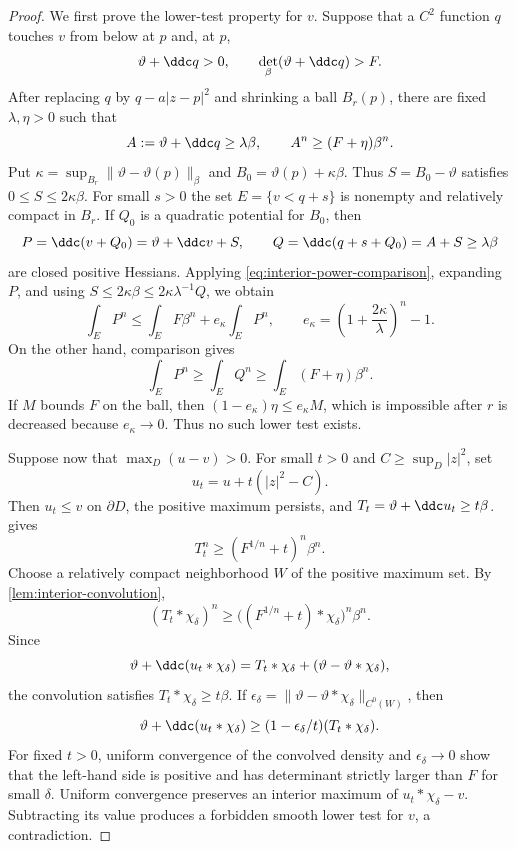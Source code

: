 \begin{proof}
We first prove the lower-test property for $v$. Suppose that a $C^2$ function $q$ touches $v$ from below at $p$ and, at $p$,
\[
  \vartheta+\ddc q>0,
  \qquad
  \det_\beta(\vartheta+\ddc q)>F.
\]
After replacing $q$ by $q-a|z-p|^2$ and shrinking a ball $B_r(p)$, there are fixed $\lambda,\eta>0$ such that
\[
  A:=\vartheta+\ddc q\geq\lambda\beta,
  \qquad A^n\geq(F+\eta)\beta^n.
\]
Put $\kappa=\sup_{B_r}\lVert\vartheta-\vartheta(p)\rVert_\beta$ and $B_0=\vartheta(p)+\kappa\beta$. Thus $S=B_0-\vartheta$ satisfies $0\leq S\leq2\kappa\beta$. For small $s>0$ the set $E=\{v<q+s\}$ is nonempty and relatively compact in $B_r$. If $Q_0$ is a quadratic potential for $B_0$, then
\[
  P=\ddc(v+Q_0)=\vartheta+\ddc v+S,
  \qquad
  Q=\ddc(q+s+Q_0)=A+S\geq\lambda\beta
\]
are closed positive Hessians. Applying \eqref{eq:interior-power-comparison}, expanding $P$, and using $S\leq2\kappa\beta\leq2\kappa\lambda^{-1}Q$, we obtain
\[
  \int_E P^n\leq\int_E F\beta^n+e_\kappa\int_E P^n,
  \qquad
  e_\kappa=\left(1+\frac{2\kappa}{\lambda}\right)^n-1.
\]
On the other hand, comparison gives
\[
  \int_E P^n\geq\int_E Q^n\geq\int_E(F+\eta)\beta^n.
\]
If $M$ bounds $F$ on the ball, then $(1-e_\kappa)\eta\leq e_\kappa M$, which is impossible after $r$ is decreased because $e_\kappa\to0$. Thus no such lower test exists.

Suppose now that $\max_D(u-v)>0$. For small $t>0$ and $C\geq\sup_D|z|^2$, set
\[
  u_t=u+t(|z|^2-C).
\]
Then $u_t\leq v$ on $\partial D$, the positive maximum persists, and $T_t=\vartheta+\ddc u_t\geq t\beta$.  gives
\[
  T_t^n\geq(F^{1/n}+t)^n\beta^n.
\]
Choose a relatively compact neighborhood $W$ of the positive maximum set. By \cref{lem:interior-convolution},
\[
  (T_t*\chi_\delta)^n
  \geq\bigl((F^{1/n}+t)*\chi_\delta\bigr)^n\beta^n.
\]
Since
\[
  \vartheta+\ddc(u_t*\chi_\delta)
  =T_t*\chi_\delta+(\vartheta-\vartheta*\chi_\delta),
\]
the convolution satisfies $T_t*\chi_\delta\geq t\beta$. If
$\epsilon_\delta=\|\vartheta-\vartheta*\chi_\delta\|_{C^0(W)}$, then
\[
 \vartheta+\ddc(u_t*\chi_\delta)
 \geq(1-\epsilon_\delta/t)(T_t*\chi_\delta).
\]
For fixed $t>0$, uniform convergence of the convolved density and
$\epsilon_\delta\to0$ show that the left-hand side is positive and has
determinant strictly larger than $F$ for small $\delta$. Uniform convergence preserves an interior maximum of $u_t*\chi_\delta-v$. Subtracting its value produces a forbidden smooth lower test for $v$, a contradiction.
\end{proof}

